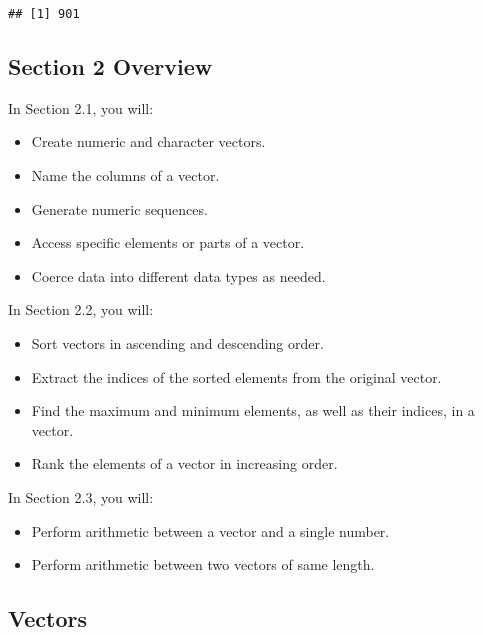 \documentclass[
]{article}
\newenvironment{Shaded}{\begin{snugshade}}{\end{snugshade}}
\newcommand{\KeywordTok}[1]{\textcolor[rgb]{0.13,0.29,0.53}{\textbf{#1}}}
\newcommand{\NormalTok}[1]{#1}
\newcommand{\OperatorTok}[1]{\textcolor[rgb]{0.81,0.36,0.00}{\textbf{#1}}}
\providecommand{\tightlist}{%
  \setlength{\itemsep}{0pt}\setlength{\parskip}{0pt}}
\begin{document}
\begin{Shaded}
\end{Shaded}

\begin{verbatim}
## [1] 901
\end{verbatim}

\hypertarget{section-2-overview}{%
\subsection{Section 2 Overview}\label{section-2-overview}}

In Section 2.1, you will:

\begin{itemize}
\tightlist
\item
  Create numeric and character vectors.
\item
  Name the columns of a vector.
\item
  Generate numeric sequences.
\item
  Access specific elements or parts of a vector.
\item
  Coerce data into different data types as needed.
\end{itemize}

In Section 2.2, you will:

\begin{itemize}
\tightlist
\item
  Sort vectors in ascending and descending order.
\item
  Extract the indices of the sorted elements from the original vector.
\item
  Find the maximum and minimum elements, as well as their indices, in a
  vector.
\item
  Rank the elements of a vector in increasing order.
\end{itemize}

In Section 2.3, you will:

\begin{itemize}
\tightlist
\item
  Perform arithmetic between a vector and a single number.
\item
  Perform arithmetic between two vectors of same length.
\end{itemize}

\hypertarget{vectors}{%
\subsection{Vectors}\label{vectors}}
\end{document}
